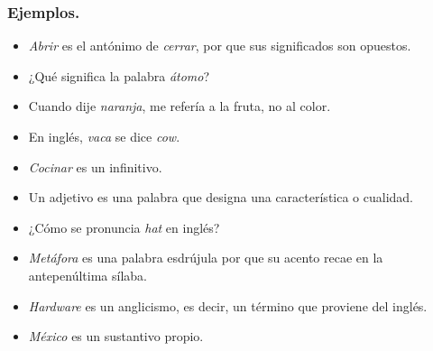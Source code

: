         \subsubsection{Ejemplos.}
    
   
        
        \begin{itemize}
            \item \textit{Abrir} es el antónimo de \textit{cerrar}, por que sus significados son opuestos.
            \item ¿Qué significa la palabra \textit{átomo}?
            \item Cuando dije \textit{naranja}, me refería a la fruta, no al color.
            \item En inglés, \textit{vaca} se dice \textit{cow}.
            \item \textit{Cocinar} es un infinitivo.
            \item Un adjetivo es una palabra que designa una característica o cualidad.
            \item ¿Cómo se pronuncia \textit{hat} en inglés?
            \item \textit{Metáfora} es una palabra esdrújula por que su acento recae en la antepenúltima sílaba.
            \item \textit{Hardware} es un anglicismo, es decir, un término que proviene del inglés.
            \item \textit{México} es un sustantivo propio.
        \end{itemize}
        
